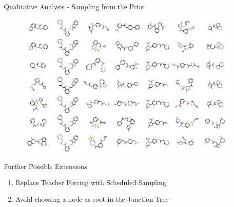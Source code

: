 \documentclass[9pt]{beamer}
\begin{document}
\begin{frame}{Qualitative Analysis - Sampling from the Prior}
	\begin{figure}[htpb]
		\centering
		\includegraphics[width=\textwidth]{includes/plots/plots.png}
	\end{figure}
\end{frame}

\begin{frame}{Further Possible Extensions}
	\begin{enumerate}
		\item Replace Teacher Forcing with Scheduled Sampling
		\item Avoid choosing a node as root in the Junction Tree
	\end{enumerate}
\end{frame}
\end{document}
